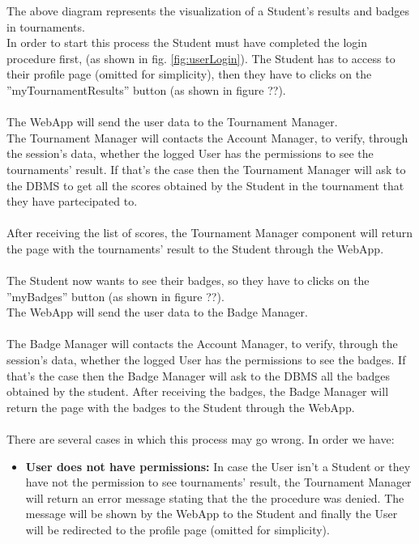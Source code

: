 \documentclass{article}
\begin{document}
{        The above diagram represents the visualization of a Student's results and badges
        in tournaments. \\
        In order to start this process the Student must have 
        completed the login procedure first, (as shown in fig. \ref{fig:userLogin}).
        The Student has to access to their profile page (omitted for simplicity), 
        then they have to clicks on the ”myTournamentResults” button (as shown in figure ??).
        \\ \\
        The WebApp will send the user data to the Tournament Manager.\\
        The Tournament Manager will contacts the Account Manager, to verify, 
        through the session’s data, whether the logged User has the 
        permissions to see the tournaments' result. If that’s the case then 
        the Tournament Manager will ask to the DBMS to get all the scores 
        obtained by the Student in the tournament that they have partecipated to.
        \\ \\
        After receiving the list of scores, the Tournament Manager component will 
        return the page with the tournaments' result to the Student through 
        the WebApp.
        \\ \\
        The Student now wants to see their badges, so they have to
        clicks on the ”myBadges” button (as shown in figure ??).\\
        The WebApp will send the user data to the Badge Manager.
        \\ \\
        The Badge Manager will contacts the Account Manager, to verify, 
        through the session’s data, whether the logged User has the 
        permissions to see the badges. If that’s the case then 
        the Badge Manager will ask to the DBMS all the badges obtained by
        the student. After receiving the badges, the Badge Manager will 
        return the page with the badges to the Student through the WebApp. 
        \\ \\
        There are several cases in which this process may go wrong. In order we have:
        \begin{itemize}
            \item \textbf{User does not have permissions:} In case the User isn't a Student or
            they have not the permission to see tournaments' result, the Tournament Manager 
            will return an error message stating that the the procedure was denied. 
            The message will be shown by the WebApp to the Student and finally the User will be
            redirected to the profile page (omitted for simplicity).
        \end{itemize}


}
\end{document}
